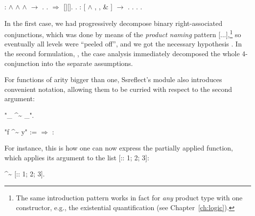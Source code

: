 \begin{coqdoccode}
\coqdocemptyline
\coqdocnoindent
{}      :  \ensuremath{\land}  \ensuremath{\land}  \ensuremath{\land}  \ensuremath{\rightarrow} .\coqdoceol
\coqdocnoindent
{}.  \ensuremath{\Rightarrow} [][]. .\coqdoceol
\coqdocemptyline
\coqdocnoindent
{}      : [ \ensuremath{\land} , ,  \& ] \ensuremath{\rightarrow} .\coqdoceol
\coqdocnoindent
{}.  . .\coqdoceol
\coqdocemptyline
\end{coqdoccode}


In the first case, we had progressively decompose binary
right-associated conjunctions, which was done by means of the \textit{product
naming} pattern [...],\footnote{The same introduction pattern works
in fact for \emph{any} product type with one constructor, e.g., the
existential quantification (see Chapter~\ref{ch:logic}).} so
eventually all levels were ``peeled off'', and we got the necessary
hypothesis . In the second formulation, , the case
analysis immediately decomposed the whole 4-conjunction into the
separate assumptions.


For functions of arity bigger than one, Ssreflect's module 
also introduces convenient notation, allowing them to be curried with
respect to the second argument:


\begin{coqdoccode}
\coqdocemptyline
\coqdocnoindent
{} "\_ \^{}\~{} \_".\coqdoceol
\end{coqdoccode}


\coqdoceol
\coqdocemptyline
\coqdocnoindent
"f \^{}\~{} y" :=   \ensuremath{\Rightarrow}        : 

\coqdocemptyline


For instance, this is how one can now express the partially applied
function, which applies its argument to the list [:: 1; 2; 3]:


\begin{coqdoccode}
\coqdocemptyline
\coqdocnoindent
{}  \^{}\~{} [:: 1; 2; 3].\coqdoceol
\coqdocemptyline
\end{coqdoccode}


